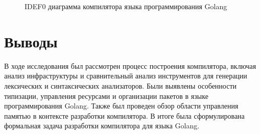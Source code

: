 \begin{figure}[h]
    \centering

    

    \caption{IDEF0 диаграмма компилятора языка программирования Golang}
    \label{fig:idef-a0}
\end{figure}


\section*{Выводы}

В ходе исследования был рассмотрен процесс построения компилятора, включая анализ инфраструктуры и сравнительный анализ инструментов для генерации лексических и синтаксических анализаторов.
Были выявлены особенности типизации, управления ресурсами и организации пакетов в языке программирования Golang.
Также был проведен обзор области управления памятью в контексте разработки компилятора.
В итоге была сформулирована формальная задача разработки компилятора для языка Golang.